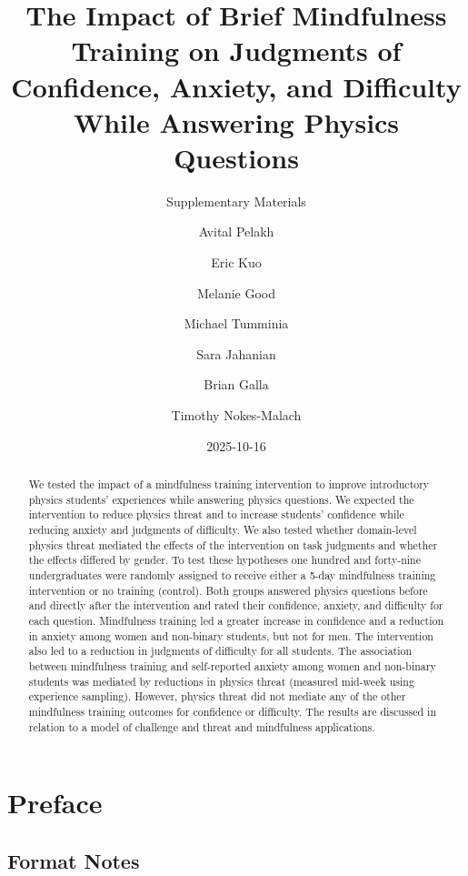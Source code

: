 \documentclass[
  letterpaper,
  DIV=11,
  numbers=noendperiod]{scrreprt}
\title{The Impact of Brief Mindfulness Training on Judgments of
Confidence, Anxiety, and Difficulty While Answering Physics Questions}
\subtitle{Supplementary Materials}
\author{Avital Pelakh \and Eric Kuo \and Melanie Good \and Michael
Tumminia \and Sara Jahanian \and Brian Galla \and Timothy Nokes-Malach}
\date{2025-10-16}
\renewcommand*\contentsname{Table of contents}
\newcommand\contentsname{Table of contents}
\begin{document}
\maketitle
\begin{abstract}
We tested the impact of a mindfulness training intervention to improve
introductory physics students' experiences while answering physics
questions. We expected the intervention to reduce physics threat and to
increase students' confidence while reducing anxiety and judgments of
difficulty. We also tested whether domain-level physics threat mediated
the effects of the intervention on task judgments and whether the
effects differed by gender. To test these hypotheses one hundred and
forty-nine undergraduates were randomly assigned to receive either a
5-day mindfulness training intervention or no training (control). Both
groups answered physics questions before and directly after the
intervention and rated their confidence, anxiety, and difficulty for
each question. Mindfulness training led a greater increase in confidence
and a reduction in anxiety among women and non-binary students, but not
for men. The intervention also led to a reduction in judgments of
difficulty for all students. The association between mindfulness
training and self-reported anxiety among women and non-binary students
was mediated by reductions in physics threat (measured mid-week using
experience sampling). However, physics threat did not mediate any of the
other mindfulness training outcomes for confidence or difficulty. The
results are discussed in relation to a model of challenge and threat and
mindfulness applications.
\end{abstract}

\renewcommand*\contentsname{Table of contents}
{
\hypersetup{linkcolor=}
\setcounter{tocdepth}{2}
\tableofcontents
}


\chapter*{Preface}\label{preface}


\section*{Format Notes}\label{format-notes}
\end{document}
